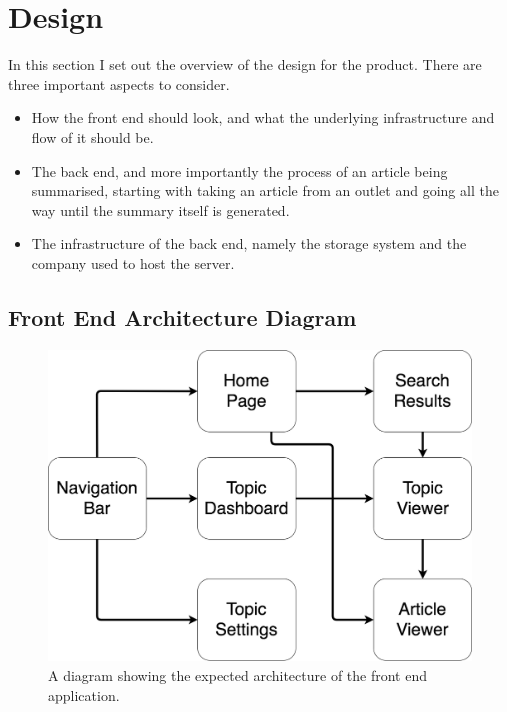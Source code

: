 \documentclass[12pt]{article}
\begin{document}

\newpage

\section{Design}

In this section I set out the overview of the design for the product. There are three important aspects to consider. 

\begin{itemize}
	\item How the front end should look, and what the underlying infrastructure and flow of it should be. 
	\item The back end, and more importantly the process of an article being summarised, starting with taking an article from an outlet and going all the way until the summary itself is generated. 
	\item The infrastructure of the back end, namely the storage system and the company used to host the server. 
\end{itemize}

\subsection{Front End Architecture Diagram}

\begin{figure}[ht!]
  \centering
    \includegraphics[scale=0.4]{FrontEndArchitecture.png}
   \caption[A basic diagram of the expected architecture of the front end]{A diagram showing the expected architecture of the front end application.}
   \label{frontEndArchitecture}
\end{figure}
\end{document}
